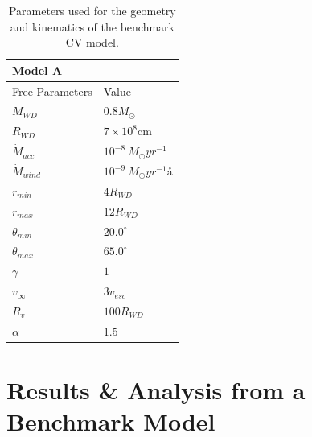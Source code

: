 \documentclass[preprint, a4paper, 11pt]{aastex}
\begin{document}
{%
%



%

%
%

\begin{table}
\centering
\begin{tabular}{p{3cm}p{4cm}}
Model A \\
\hline Free Parameters 	&	 Value \\ 
\hline \hline 
$M_{WD}$ 	 &	 $0.8 M_{\odot}$ \\ 
$R_{WD}$ 	 &	 $7\times10^{8}$cm\\ 
$\dot{M}_{acc}$ 	 &	 $10^{-8}~M_{\odot}yr^{-1}$\\ 
$\dot{M}_{wind}$  &	$10^{-9}~M_{\odot}yr^{-1}$å\\ 
$r_{min}$ 	&	 $4 R_{WD}$\\ 
$r_{max}$ 	&	 $12 R_{WD}$ \\ 
$\theta_{min}$ 	&	 $20.0^{\circ}$ \\ 
$\theta_{max}$ 	&	 $65.0^{\circ}$ \\ 
$\gamma$ 	&	 $1$ \\ 
$v_{\infty}$ 	&	 $3v_{esc}$ \\ 
$R_v$ 	        &	 $100 R_{WD}$ \\ 
$\alpha$ 	&	 $1.5$ \\
\end{tabular}
\centering
\caption{
Parameters used for the geometry and kinematics of the benchmark CV model.}
\label{wind_param}
\end{table}




\section{Results \& Analysis from a Benchmark Model}


}
\end{document}
